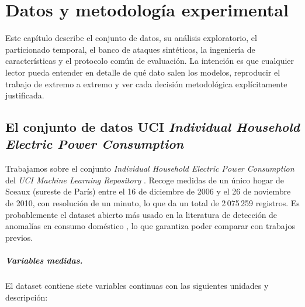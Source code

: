 \chapter{Datos y metodología experimental}
\label{cap:datos}

Este capítulo describe el conjunto de datos, su análisis exploratorio, el particionado temporal, el banco de ataques sintéticos, la ingeniería de características y el protocolo común de evaluación. La intención es que cualquier lector pueda entender en detalle de qué dato salen los modelos, reproducir el trabajo de extremo a extremo y ver cada decisión metodológica explícitamente justificada.

\section{El conjunto de datos UCI \emph{Individual Household Electric Power Consumption}}
\label{sec:uci}

Trabajamos sobre el conjunto \textit{Individual Household Electric Power Consumption} del \textit{UCI Machine Learning Repository} \cite{hebrail2012uci}. Recoge medidas de un único hogar de Sceaux (sureste de París) entre el 16 de diciembre de 2006 y el 26 de noviembre de 2010, con resolución de un minuto, lo que da un total de 2\,075\,259 registros. Es probablemente el dataset abierto más usado en la literatura de detección de anomalías en consumo doméstico \cite{himeur2021review}, lo que garantiza poder comparar con trabajos previos.

\paragraph{Variables medidas.} El dataset contiene siete variables continuas con las siguientes unidades y descripción:

